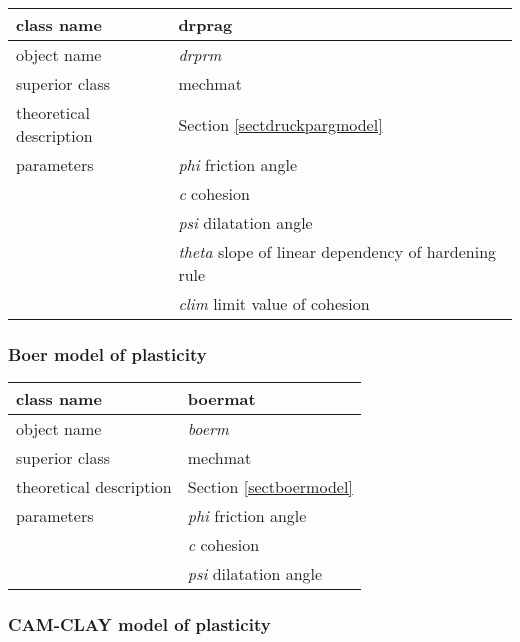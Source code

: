 \begin{center}
\begin{tabular}{|l|l|}
\hline
class name & {\sf drprag}\index{class!{\sf drprag}}
\\ \hline
object name & {\it drprm}\index{instance!{\it drprm}}
\\ \hline
superior class & {\sf mechmat}
\\ \hline
theoretical description & Section \ref{sectdruckpargmodel}
\\ \hline
parameters & {\it phi} friction angle
\\
 & {\it c} cohesion
\\
 & {\it psi} dilatation angle
\\
 & {\it theta} slope of linear dependency of hardening rule
\\
 & {\it clim} limit value of cohesion
\\ \hline
\end{tabular}
\end{center}

\subsubsection{Boer model of plasticity}

\begin{center}
\begin{tabular}{|l|l|}
\hline
class name & {\sf boermat}\index{class!{\sf boermat}}
\\ \hline
object name & {\it boerm}\index{instance!{\it boerm}}
\\ \hline
superior class & {\sf mechmat}
\\ \hline
theoretical description & Section \ref{sectboermodel}
\\ \hline
parameters & {\it phi} friction angle
\\
 & {\it c} cohesion
\\
 & {\it psi} dilatation angle
\\ \hline
\end{tabular}
\end{center}

\subsubsection{CAM-CLAY model of plasticity}

